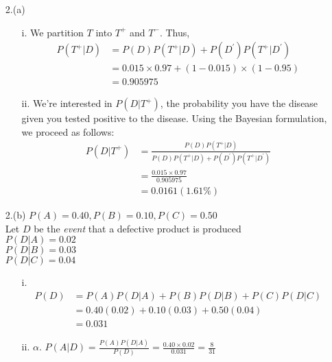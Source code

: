 \documentclass[12pt,a4paper, fleq]{article}
\begin{document}
\begin{itemize}
\item[2.(a)] %
\begin{itemize}
\item[i.]
We partition $T$ into $T^+$ and $T^-$. Thus, 
\begin{equation*}
\begin{split}
P(T^+|D) & = P(D)P(T^+\vert D) + P(D^\prime)P(T^+\vert D^\prime)\\
& = 0.015 \times 0.97 + (1-0.015) \times (1-0.95)\\
& = 0.905975
\end{split}
\end{equation*}

\item[ii.]
We're interested in $P(D\vert T^+)$, the probability you have the disease given
you tested positive to the disease. Using the Bayesian formulation, we proceed as follows:
\begin{equation*}
\begin{split}
P(D\vert T^+) &= \frac{P(D)P(T^+\vert D)}{P(D)P(T^+\vert D) + P(D^\prime)P(T^+\vert D^\prime)}\\[2mm]
&= \frac{0.015 \times 0.97}{0.905975}\\[2mm]
&= 0.0161 (\mathbf{1.61\%})
\end{split}
\end{equation*}
\end{itemize}

\item[2.(b)] %
$P(A) = 0.40, P(B) = 0.10, P(C) = 0.50$\\
Let $D$ be the {\it event} that a defective product is produced\\
$P(D|A) = 0.02$\\
$P(D|B) = 0.03$ \\
$P(D|C) = 0.04$ 

\begin{itemize}
\item[i.]
\begin{equation*}
\begin{split}
P(D) &= P(A)P(D|A) + P(B)P(D|B) + P(C)P(D|C)\\
& = 0.40(0.02) + 0.10(0.03) + 0.50(0.04)\\
& = 0.031
\end{split}
\end{equation*}

\item[ii.]
$\alpha.$ $P(A|D) = \frac{P(A)P(D|A)}{P(D)} = \frac{0.40\times 0.02}{0.031} = \frac{8}{31}$


\end{itemize}
\end{itemize}
\end{document}
